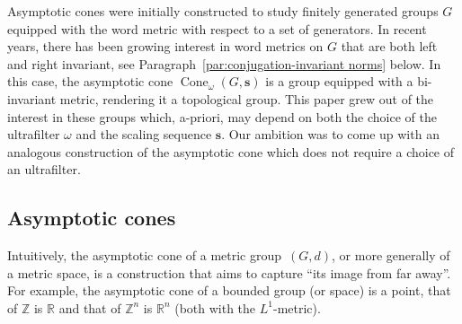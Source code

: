 \documentclass[12pt]{amsart}
\theoremstyle{definition}
\def\RR{\ensuremath{\mathbb{R}}}
\def\ZZ{\ensuremath{\mathbb{Z}}}
\newcommand{\B}[1]{\mathbf{#1}}
\newcommand{\OP}[1]{\operatorname{#1}}
\def\Cone{\OP{Cone}}
\def\tC{\hat{\mathcal{C}}}
\begin{document}
Asymptotic cones were initially constructed to study finitely generated groups $G$ equipped with the word metric with respect to a set of generators.
In recent years, there has been growing interest in word metrics on $G$ that are both left and right invariant, see Paragraph~\ref{par:conjugation-invariant norms} below.
In this case, the asymptotic cone $\Cone_\omega(G,\B s)$ is a group equipped with a bi-invariant metric, rendering it a topological group. 
This paper grew out of the interest in these groups which, a-priori, may depend on both the choice of the ultrafilter $\omega$ and the scaling sequence $\B s$.
Our ambition was to come up with an analogous construction of the asymptotic cone which does not require a choice of an ultrafilter.

\subsection{Asymptotic cones}
Intuitively, the asymptotic cone of a metric group~$(G,d)$, or more generally of a metric space, is a construction that aims to capture ``its image from far away''.
For example, the asymptotic cone of a bounded group (or space) is a point, that of $\ZZ$ is  $\RR$ and that of $\ZZ^n$ is $\RR^n$ (both with the $L^1$-metric).
\end{document}
